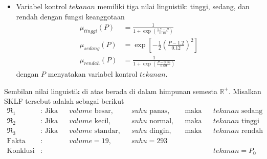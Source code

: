 \begin{contoh}
\begin{itemize}
    \item Variabel kontrol $tekanan$ memiliki tiga nilai linguistik: tinggi, sedang, dan rendah dengan fungsi keanggotaan
    \begin{align*}
        \mu_{tinggi}(P) &= \displaystyle\frac{1}{ 1+\exp\left(\displaystyle\frac{\num{1,7}-P}{\num{0,18}} \right) }\\
        \mu_{sedang}(P) &= \exp \left[-\displaystyle\frac{1}{2} \left( \displaystyle\frac{P-\num{1,2}}{\num{0,12}} \right)^2 \right]\\
        \mu_{rendah}(P) &= \displaystyle\frac{1}{ 1+\exp\left(\displaystyle\frac{P-\num{0,86}}{\num{0,09}} \right) }
    \end{align*}
    dengan $P$ menyatakan variabel kontrol $tekanan$.
\end{itemize}
Sembilan nilai linguistik di atas berada di dalam himpunan semesta $\mathbb{R}^+$. Misalkan SKLF tersebut adalah sebagai berikut
\begin{align*}
\Re_1 &: \text{ Jika} && volume \text{ besar,} && suhu \text{ panas,}
&&\text{maka} && tekanan \text{ sedang}\\
\Re_2 &: \text{ Jika} && volume \text{ kecil,} && suhu \text{ normal,}
&&\text{maka} && tekanan \text{ tinggi}\\
\Re_3 &: \text{ Jika} && volume \text{ standar,} && suhu \text{ dingin,}
&&\text{maka} && tekanan \text{ rendah}\\
\text{Fakta} &: && volume = 19\text{,} && suhu = 293\\
\hline
\text{Konklusi} &: && && && && tekanan = P_0
\end{align*}


\end{contoh}
